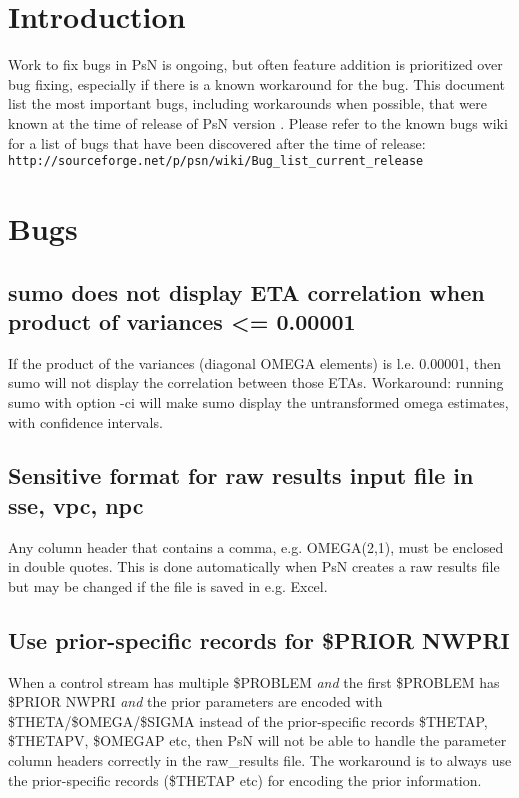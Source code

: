




\maketitle


\section{Introduction}
Work to fix bugs in PsN is ongoing, but often feature addition is prioritized over bug fixing, 
especially if there is a known workaround for the bug. This document list the most important bugs, including workarounds when possible,
that were known at the time of release of PsN version \psnversion. Please refer to the known bugs wiki
for a list of bugs that have been discovered after the time of release:\\
\texttt{http://sourceforge.net/p/psn/wiki/Bug\_list\_current\_release}   

\section{Bugs}

\subsection{sumo does not display ETA correlation when product of variances <= 0.00001}
If the product of the variances (diagonal OMEGA elements) is l.e. 0.00001, then sumo will not display the correlation between those
ETAs. Workaround: running sumo with option -ci will make sumo display the untransformed omega estimates, with confidence intervals.

\subsection{Sensitive format for raw results input file in sse, vpc, npc}
Any column header that contains a comma, e.g. OMEGA(2,1), must be enclosed in double quotes. This is done automatically when PsN creates a raw results file but may be changed if the file is saved in e.g. Excel.

\subsection{Use prior-specific records for \$PRIOR NWPRI}
When a control stream has multiple \$PROBLEM \emph{and} the first \$PROBLEM has \$PRIOR NWPRI
\emph{and} the prior parameters are encoded with \$THETA/\$OMEGA/\$SIGMA instead of the
prior-specific records \$THETAP, \$THETAPV, \$OMEGAP etc, then PsN will not be able to handle the parameter column
headers correctly in the raw\_results file. The workaround is to always use the prior-specific records 
(\$THETAP etc) for encoding the prior information.

